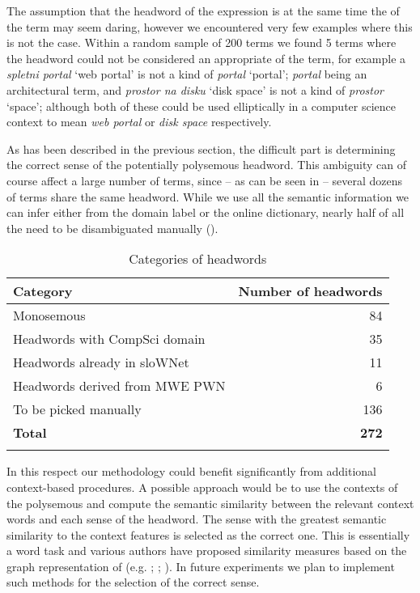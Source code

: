\documentclass[output=paper]{LSP/langsci}
\begin{document}
The assumption that the headword of the  expression is at the same time the  of the term may seem daring, however we encountered very few examples where this is not the case. Within a random sample of 200  terms we found 5 terms where the headword could not be considered an appropriate  of the term, for example a \textit{spletni portal} `web portal' is not a kind of \textit{portal} `portal'; \textit{portal} being an architectural term, and \textit{prostor na disku} `disk space' is not a kind of \textit{prostor} `space'; although both of these  could be used elliptically in a computer science context to mean \textit{web portal} or \textit{disk space} respectively. 

As has been described in the previous section, the difficult part is determining the correct sense of the potentially polysemous headword. This ambiguity can of course affect a large number of terms, since -- as can be seen in  -- several dozens of  terms share the same headword. While we use all the semantic information we can infer either from the domain label or the online dictionary, nearly half of all the  need to be disambiguated manually ().

\begin{table}
\begin{tabular}{lr}
\lsptoprule
\textbf{Category} & \textbf{Number of headwords}\\
\midrule
Monosemous & 84\\
Headwords with CompSci domain & 35\\
Headwords already in sloWNet &  11\\
Headwords derived from MWE PWN & 6\\
To be picked manually & 136\\
\textbf{Total} & \textbf{272}\\
\lspbottomrule
\end{tabular}
\caption{Categories of headwords}
\label{tab:vintar:9}
\end{table}

In this respect our methodology could benefit significantly from additional context-based  procedures. A possible approach would be to use the contexts of the polysemous  and compute the semantic similarity between the relevant context words and each sense of the headword. The sense with the greatest semantic similarity to the context features is selected as the correct one. This is essentially a word  task and various authors have proposed similarity measures based on the graph representation of  (e.g. \citealt{Leacock1998}; \citealt{Wu1994}; \citealt{AgirreEtAl2009}). In future experiments we plan to implement such methods for the selection of the correct sense.
\end{document}
